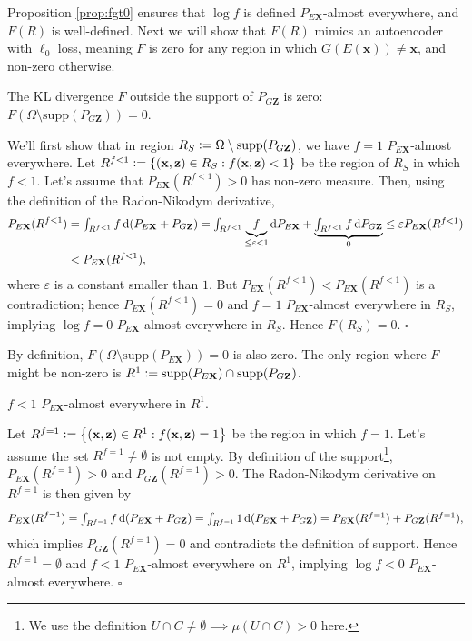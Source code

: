 \documentclass{article}
\newcommand{\defeq}{\vcentcolon=}
\renewcommand{\d}{\mathop{}\!\mathrm{d}}
\def\smallint{\begingroup\textstyle \int\endgroup}
\renewcommand{\vec}[1]{\mathbf{#1}}
\newcommand{\x}{\vec{x}}
\newcommand{\X}{\vec{X}}
\newcommand{\z}{\vec{z}}
\newcommand{\Z}{\vec{Z}}
\begin{document}
\begin{appendices}
Proposition \ref{prop:fgt0} ensures
that $\log f$ is defined $P_{E\X}$-almost everywhere, and $F(R)$ is well-defined.
Next we will show that $F(R)$ mimics an autoencoder with $\ell_0$ loss, meaning $F$ is zero for any region in which $G(E(\x))\ne \x$, and non-zero otherwise.

\begin{proposition}
\label{prop:pgzsupport}
The KL divergence $F$ outside the support of $P_{G\Z}$ is zero: $F(\Omega \setminus \mathrm{supp}(P_{G\Z})) = 0$.
\end{proposition}
We'll first show that in region $R_S \defeq \Omega \setminus \mathrm{supp}(P_{G\Z})$, we have $f = 1$ $P_{E\X}$-almost everywhere.
Let $R^{f < 1} \defeq \left\{ (\x, \z) \in R_S : f(\x, \z) < 1 \right\}$ be the region of $R_S$ in which $f < 1$.
Let's assume that $P_{E\X}(R^{f<1}) > 0$ has non-zero measure.
Then, using the definition of the Radon-Nikodym derivative,
\begin{align*}
 P_{E\X}(R^{f<1}) &= \smallint_{R^{f<1}} f \d (P_{E\X} + P_{G\Z}) = \smallint_{R^{f<1}} \underbrace{f}_{\le \varepsilon < 1} \d P_{E\X} + \underbrace{\smallint_{R^{f<1}} f \d P_{G\Z}}_{0} \le \varepsilon P_{E\X}(R^{f<1})\\
 &< P_{E\X}(R^{f<1}),
\end{align*}
where $\varepsilon$ is a constant smaller than $1$.
But $P_{E\X}(R^{f<1}) < P_{E\X}(R^{f<1})$ is a contradiction;
hence $P_{E\X}(R^{f<1}) = 0$ and $f = 1$ $P_{E\X}$-almost everywhere in $R_S$,
implying $\log f = 0$ $P_{E\X}$-almost everywhere in $R_S$.
Hence $F(R_S)=0$. $\square$

By definition, $F(\Omega \setminus \mathrm{supp}(P_{E\X})) = 0$ is also zero.
The only region where $F$ might be non-zero is $R^{1} \defeq \mathrm{supp}(P_{E\X}) \cap \mathrm{supp}(P_{G\Z})$.

\begin{proposition}
\label{prop:flt1}
$f < 1$ $P_{E\X}$-almost everywhere in $R^1$.
\end{proposition}
Let $R^{f=1} \defeq \left\{ (\x, \z) \in R^1 : f(\x, \z) = 1 \right\}$ be the region in which $f=1$.
Let's assume the set $R^{f=1} \ne \emptyset$ is not empty.
By definition of the support\footnote{We use the definition $U\cap C\neq\emptyset \implies \mu (U\cap C)>0$ here.},
$P_{E\X}(R^{f=1}) > 0$ and $P_{G\Z}(R^{f=1})>0$.
The Radon-Nikodym derivative on $R^{f=1}$ is then given by
\begin{align*}
 P_{E\X}(R^{f=1}) = \smallint_{R^{f=1}} f \d (P_{E\X} + P_{G\Z}) = \smallint_{R^{f=1}} 1 \d (P_{E\X} + P_{G\Z}) = P_{E\X}(R^{f=1}) + P_{G\Z}(R^{f=1}),
\end{align*}
which implies $P_{G\Z}(R^{f=1}) = 0$ and contradicts the definition of support. Hence $R^{f=1} = \emptyset$ and $f<1$ $P_{E\X}$-almost everywhere on $R^1$, implying $\log f < 0$ $P_{E\X}$-almost everywhere. $\square$


\end{appendices}
\end{document}
